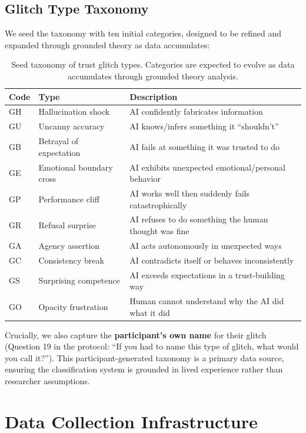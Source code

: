 \documentclass[11pt,a4paper]{article}
\begin{document}
\subsection{Glitch Type Taxonomy}

We seed the taxonomy with ten initial categories, designed to be refined and expanded through grounded theory as data accumulates:

\begin{table}[h]
\centering
\begin{tabular}{@{}lll@{}}
\toprule
\textbf{Code} & \textbf{Type} & \textbf{Description} \\
\midrule
GH & Hallucination shock & AI confidently fabricates information \\
GU & Uncanny accuracy & AI knows/infers something it ``shouldn't'' \\
GB & Betrayal of expectation & AI fails at something it was trusted to do \\
GE & Emotional boundary cross & AI exhibits unexpected emotional/personal behavior \\
GP & Performance cliff & AI works well then suddenly fails catastrophically \\
GR & Refusal surprise & AI refuses to do something the human thought was fine \\
GA & Agency assertion & AI acts autonomously in unexpected ways \\
GC & Consistency break & AI contradicts itself or behaves inconsistently \\
GS & Surprising competence & AI exceeds expectations in a trust-building way \\
GO & Opacity frustration & Human cannot understand why the AI did what it did \\
\bottomrule
\end{tabular}
\caption{Seed taxonomy of trust glitch types. Categories are expected to evolve as data accumulates through grounded theory analysis.}
\label{tab:taxonomy}
\end{table}

Crucially, we also capture the \textbf{participant's own name} for their glitch (Question 19 in the protocol: ``If you had to name this type of glitch, what would you call it?''). This participant-generated taxonomy is a primary data source, ensuring the classification system is grounded in lived experience rather than researcher assumptions.

\section{Data Collection Infrastructure}
\end{document}
